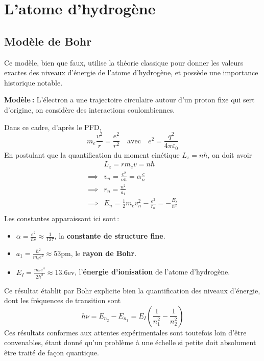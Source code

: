 \section{L’atome d’hydrogène}

    \subsection{Modèle de Bohr}

        Ce modèle, bien que faux, utilise la théorie classique pour donner les valeurs exactes des niveaux d’énergie de l’atome d’hydrogène, et possède une importance historique notable. 

        \textbf{Modèle :} L’électron a une trajectoire circulaire autour d’un proton fixe qui sert d’origine, on considère des interactions coulombiennes.

        Dans ce cadre, d’après le PFD, 
        \[ m_e \frac{v^2}{r} = \frac{e^2}{r^2} \quad \text{avec} \quad e^2 = \frac{q^2}{4 \pi \varepsilon_0} \]   
        En postulant que la quantification du moment cinétique $L_z = n \hbar$, on doit avoir 
        \begin{align*}
            &L_z = r m_e v = n \hbar  \\
            \implies &v_n = \frac{e^2}{n\hbar} = \alpha \frac{c}{n} \\
            \implies &r_n = \frac{n^2}{a_1} \\
            \implies &E_n = \frac{1}{2} m_e v_n^2 - \frac{e^2}{r_n} = - \frac{E_I}{n^2} \\
        \end{align*}
        Les constantes apparaissant ici sont :
        \begin{itemize}
            \item $\alpha= \frac{e^2}{\hbar c } \approx \frac{1}{137}$, la \textbf{constante de structure fine}.
            \item $a_1 = \frac{\hbar^2}{m_e e^2} \approx 53\text{pm}$, le \textbf{rayon de Bohr}.
            \item $E_I = \frac{m_e e^4}{2 \hbar^2} \approx 13.6\text{ev}$, l’\textbf{énergie d’ionisation} de l’atome d’hydrogène.
        \end{itemize}
        Ce résultat établit par Bohr explicite bien la quantification des niveaux d’énergie, dont les fréquences de transition sont 
        \[ h \nu = E_{n_2} - E_{n_1} = E_I \left(\frac{1}{n_1^2} - \frac{1}{n_2^2}\right) \]   
        Ces résultats conformes aux attentes expérimentales sont toutefois loin d’être convenables, étant donné qu’un problème à une échelle si petite doit absolument être traité de façon quantique.


